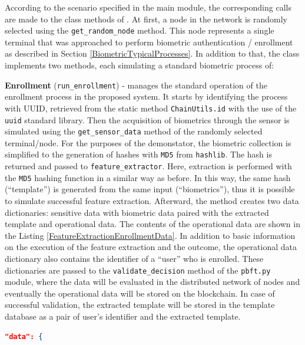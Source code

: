 According to the scenario specified in the main module, the corresponding calls are made to the class methods of . At first, a node in the network is randomly selected using the \texttt{get\_random\_node} method. This node represents a single terminal that was approached to perform biometric authentication / enrollment as described in Section \ref{BiometricTypicalProcesses}. In addition to that, the  class implements two methods, each simulating a standard biometric process of:
\begin{description}
    \item \textbf{Enrollment} (\texttt{run\_enrollment}) - manages the standard operation of the enrollment process in the proposed system. It starts by identifying the process with UUID, retrieved from the static method \texttt{ChainUtils.id} with the use of the \texttt{uuid} standard library. Then the acquisition of biometrics through the sensor is simulated using the \texttt{get\_sensor\_data} method of the randomly selected terminal/node. For the purposes of the demonstator, the biometric collection is simplified to the generation of hashes with \texttt{MD5} from \texttt{hashlib}. The hash is returned and passed to \texttt{feature\_extractor}. Here, extraction is performed with the \texttt{MD5} hashing function in a similar way as before. In this way, the same hash (``template'') is generated from the same input (``biometrics''), thus it is possible to simulate successful feature extraction. Afterward, the method creates two data dictionaries: sensitive data with biometric data paired with the extracted template and operational data. The contents of the operational data are shown in the Listing \ref{FeatureExtractionEnrollmentData}. In addition to basic information on the execution of the feature extraction and the outcome, the operational data dictionary also contains the identifier of a ``user'' who is enrolled. These dictionaries are passed to the \texttt{validate\_decision} method of the \texttt{pbft.py} module, where the data will be evaluated in the distributed network of nodes and eventually the operational data will be stored on the blockchain. In case of successful validation, the extracted template will be stored in the template database as a pair of user's identifier and the extracted template.
    \begin{lstlisting}[language=json,frame=single,breaklines=true, caption={Transaction data of feature extraction in enrollment.},captionpos=b, label={FeatureExtractionEnrollmentData}]
     "data": {

\end{lstlisting}
\end{description}
